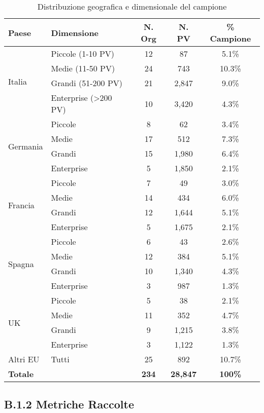 \begin{table}[h!]
\centering
\caption{Distribuzione geografica e dimensionale del campione}
\label{tab:sample-distribution}
\begin{tabular}{llccc}
\toprule
\textbf{Paese} & \textbf{Dimensione} & \textbf{N. Org} & \textbf{N. PV} & \textbf{\% Campione} \\
\midrule
\multirow{4}{*}{Italia} & Piccole (1-10 PV) & 12 & 87 & 5.1\% \\
 & Medie (11-50 PV) & 24 & 743 & 10.3\% \\
 & Grandi (51-200 PV) & 21 & 2,847 & 9.0\% \\
 & Enterprise (>200 PV) & 10 & 3,420 & 4.3\% \\
\midrule
\multirow{4}{*}{Germania} & Piccole & 8 & 62 & 3.4\% \\
 & Medie & 17 & 512 & 7.3\% \\
 & Grandi & 15 & 1,980 & 6.4\% \\
 & Enterprise & 5 & 1,850 & 2.1\% \\
\midrule
\multirow{4}{*}{Francia} & Piccole & 7 & 49 & 3.0\% \\
 & Medie & 14 & 434 & 6.0\% \\
 & Grandi & 12 & 1,644 & 5.1\% \\
 & Enterprise & 5 & 1,675 & 2.1\% \\
\midrule
\multirow{4}{*}{Spagna} & Piccole & 6 & 43 & 2.6\% \\
 & Medie & 12 & 384 & 5.1\% \\
 & Grandi & 10 & 1,340 & 4.3\% \\
 & Enterprise & 3 & 987 & 1.3\% \\
\midrule
\multirow{4}{*}{UK} & Piccole & 5 & 38 & 2.1\% \\
 & Medie & 11 & 352 & 4.7\% \\
 & Grandi & 9 & 1,215 & 3.8\% \\
 & Enterprise & 3 & 1,122 & 1.3\% \\
\midrule
Altri EU & Tutti & 25 & 892 & 10.7\% \\
\midrule
\textbf{Totale} & & \textbf{234} & \textbf{28,847} & \textbf{100\%} \\
\bottomrule
\end{tabular}
\end{table}

\subsection{B.1.2 Metriche Raccolte}

